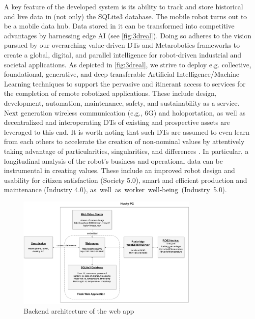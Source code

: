 \documentclass[conference]{IEEEtran}
\begin{document}
A key feature of the developed system is its ability to track and store historical and live data in (not only) the SQLite3 database. The mobile robot turns out to be a mobile data hub. Data stored in it can be transformed into competitive advantages by harnessing edge AI (see \cref{fig:3dreal}). Doing so adheres to the vision pursued by our overarching value-driven DTs \cite{kaigom2020value} and Metarobotics \cite{kaigom} frameworks to create a global, digital, and parallel  intelligence for robot-driven industrial and societal applications. As depicted in \cref{fig:3dreal}, we strive  to deploy e.g. collective, foundational, generative, and deep transferable Artificial Intelligence/Machine Learning techniques to support the pervasive and itinerant access to services for the completion of remote robotized applications. These include design, development, automation, maintenance, safety, and sustainability as a service. Next generation wireless communication (e.g., 6G) and holoportation, as well as decentralized and interoperating DTs of existing and prospective assets are leveraged to this end. It is worth noting that such DTs are assumed to even learn from each others to accelerate the creation of non-nominal values by attentively taking advantage of particularities, singularities, and differences \cite{kaigom}. In particular, a longitudinal analysis of the robot's business and operational data can be instrumental in creating values. These include an improved robot design and usability for citizen satisfaction (Society 5.0),  smart and efficient production and maintenance (Industry 4.0), \mbox{as well as worker well-being (Industry 5.0).} %
\begin{figure}[t]
    \centerline{\includegraphics[width=8.9cm]{Pictures/userappbig.pdf}}
    \caption{Backend architecture of the web app}
    \label{fig:userapp}
\end{figure}
\end{document}
